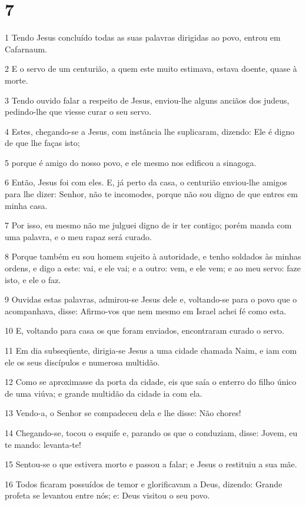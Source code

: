 \chapter{7}

\par 1 Tendo Jesus concluído todas as suas palavras dirigidas ao povo, entrou em Cafarnaum.
\par 2 E o servo de um centurião, a quem este muito estimava, estava doente, quase à morte.
\par 3 Tendo ouvido falar a respeito de Jesus, enviou-lhe alguns anciãos dos judeus, pedindo-lhe que viesse curar o seu servo.
\par 4 Estes, chegando-se a Jesus, com instância lhe suplicaram, dizendo: Ele é digno de que lhe faças isto;
\par 5 porque é amigo do nosso povo, e ele mesmo nos edificou a sinagoga.
\par 6 Então, Jesus foi com eles. E, já perto da casa, o centurião enviou-lhe amigos para lhe dizer: Senhor, não te incomodes, porque não sou digno de que entres em minha casa.
\par 7 Por isso, eu mesmo não me julguei digno de ir ter contigo; porém manda com uma palavra, e o meu rapaz será curado.
\par 8 Porque também eu sou homem sujeito à autoridade, e tenho soldados às minhas ordens, e digo a este: vai, e ele vai; e a outro: vem, e ele vem; e ao meu servo: faze isto, e ele o faz.
\par 9 Ouvidas estas palavras, admirou-se Jesus dele e, voltando-se para o povo que o acompanhava, disse: Afirmo-vos que nem mesmo em Israel achei fé como esta.
\par 10 E, voltando para casa os que foram enviados, encontraram curado o servo.
\par 11 Em dia subseqüente, dirigia-se Jesus a uma cidade chamada Naim, e iam com ele os seus discípulos e numerosa multidão.
\par 12 Como se aproximasse da porta da cidade, eis que saía o enterro do filho único de uma viúva; e grande multidão da cidade ia com ela.
\par 13 Vendo-a, o Senhor se compadeceu dela e lhe disse: Não chores!
\par 14 Chegando-se, tocou o esquife e, parando os que o conduziam, disse: Jovem, eu te mando: levanta-te!
\par 15 Sentou-se o que estivera morto e passou a falar; e Jesus o restituiu a sua mãe.
\par 16 Todos ficaram possuídos de temor e glorificavam a Deus, dizendo: Grande profeta se levantou entre nós; e: Deus visitou o seu povo.
